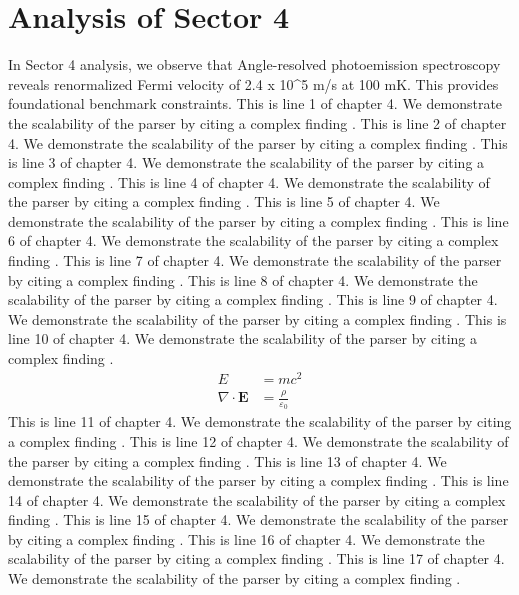 \chapter{Analysis of Sector 4}

In Sector 4 analysis, we observe that Angle-resolved photoemission spectroscopy reveals renormalized Fermi velocity of 2.4 x 10^5 m/s at 100 mK. This provides foundational benchmark constraints.
This is line 1 of chapter 4. We demonstrate the scalability of the parser by citing a complex finding \cite{ref4_1}.
This is line 2 of chapter 4. We demonstrate the scalability of the parser by citing a complex finding \cite{ref4_2}.
This is line 3 of chapter 4. We demonstrate the scalability of the parser by citing a complex finding \cite{ref4_3}.
This is line 4 of chapter 4. We demonstrate the scalability of the parser by citing a complex finding \cite{ref4_4}.
This is line 5 of chapter 4. We demonstrate the scalability of the parser by citing a complex finding \cite{ref4_5}.
This is line 6 of chapter 4. We demonstrate the scalability of the parser by citing a complex finding \cite{ref4_6}.
This is line 7 of chapter 4. We demonstrate the scalability of the parser by citing a complex finding \cite{ref4_7}.
This is line 8 of chapter 4. We demonstrate the scalability of the parser by citing a complex finding \cite{ref4_8}.
This is line 9 of chapter 4. We demonstrate the scalability of the parser by citing a complex finding \cite{ref4_9}.
This is line 10 of chapter 4. We demonstrate the scalability of the parser by citing a complex finding \cite{ref4_10}.
\begin{align*}
  E &= mc^2 \\
  \nabla \cdot \mathbf{E} &= \frac{\rho}{\varepsilon_0}
\end{align*}
This is line 11 of chapter 4. We demonstrate the scalability of the parser by citing a complex finding \cite{ref4_11}.
This is line 12 of chapter 4. We demonstrate the scalability of the parser by citing a complex finding \cite{ref4_12}.
This is line 13 of chapter 4. We demonstrate the scalability of the parser by citing a complex finding \cite{ref4_13}.
This is line 14 of chapter 4. We demonstrate the scalability of the parser by citing a complex finding \cite{ref4_14}.
This is line 15 of chapter 4. We demonstrate the scalability of the parser by citing a complex finding \cite{ref4_15}.
This is line 16 of chapter 4. We demonstrate the scalability of the parser by citing a complex finding \cite{ref4_16}.
This is line 17 of chapter 4. We demonstrate the scalability of the parser by citing a complex finding \cite{ref4_17}.
